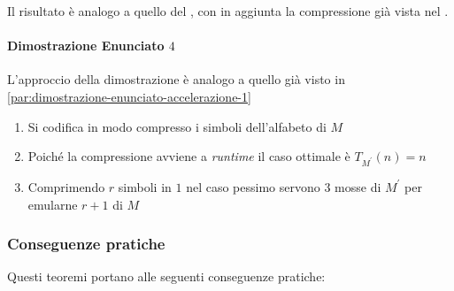 \documentclass[italian, 10pt]{article}
\begin{document}

Il risultato è analogo a quello del , con in aggiunta la compressione già vista nel .

\paragraph[Dimostrazione Enunciato 4]{Dimostrazione Enunciato \(4\)}

L'approccio della dimostrazione è analogo a quello già visto in \ref{par:dimostrazione-enunciato-accelerazione-1}

\begin{enumerate}
  \item Si codifica in modo compresso i simboli dell'alfabeto di \(M\)
  \item Poiché la compressione avviene a \textit{runtime} il caso ottimale è \(T_{M^\prime}(n) = n\)
  \item Comprimendo \(r\) simboli in \(1\) nel caso pessimo servono \(3\) mosse di \(M^\prime\) per emularne \(r+1\) di \(M\)
\end{enumerate}

\subsubsection{Conseguenze pratiche}

Questi teoremi portano alle seguenti conseguenze pratiche:
\end{document}
